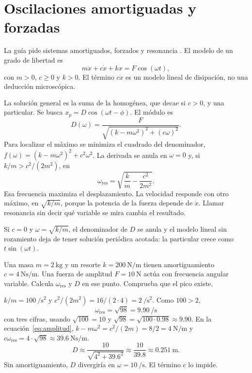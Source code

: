 \section{Oscilaciones amortiguadas y forzadas}

La guía pide sistemas amortiguados, forzados y resonancia \parencite{uleGuia2026}. El modelo de un grado de libertad es
\begin{equation}
\label{eq:oscilador}
m\ddot x+c\dot x+kx=F\cos(\omega t),
\end{equation}
con \(m>0\), \(c\ge 0\) y \(k>0\). El término \(c\dot x\) es un modelo lineal de disipación, no una deducción microscópica.

La solución general es la suma de la homogénea, que decae si \(c>0\), y una particular. Se busca \(x_p=D\cos(\omega t-\phi)\). El módulo es
\begin{equation}
\label{eq:amplitud}
D(\omega)=\frac{F}{\sqrt{(k-m\omega^2)^2+(c\omega)^2}}.
\end{equation}
Para localizar el máximo se minimiza el cuadrado del denominador, \(f(\omega)=(k-m\omega^2)^2+c^2\omega^2\). La derivada se anula en \(\omega=0\) y, si \(k/m>c^2/(2m^2)\), en
\begin{equation}
\label{eq:resonancia}
\omega_{\mathrm{res}}=\sqrt{\frac{k}{m}-\frac{c^2}{2m^2}}.
\end{equation}
Esa frecuencia maximiza el desplazamiento. La velocidad responde con otro máximo, en \(\sqrt{k/m}\), porque la potencia de la fuerza depende de \(\dot x\). Llamar resonancia sin decir qué variable se mira cambia el resultado.

Si \(c=0\) y \(\omega=\sqrt{k/m}\), el denominador de \(D\) se anula y el modelo lineal sin rozamiento deja de tener solución periódica acotada: la particular crece como \(t\sin(\omega t)\).

\begin{problembox}[Intermedio]
Una masa \(m=\qty{2}{\kilogram}\) y un resorte \(k=\qty{200}{\newton\per\metre}\) tienen amortiguamiento \(c=\qty{4}{\newton\second\per\metre}\). Una fuerza de amplitud \(F=\qty{10}{\newton}\) actúa con frecuencia angular variable. Calcula \(\omega_{\mathrm{res}}\) y \(D\) en ese punto. Comprueba que el pico existe.
\end{problembox}
\begin{solutionbox}
\(k/m=\qty{100}{\per\second\squared}\) y \(c^2/(2m^2)=16/(2\cdot 4)=\qty{2}{\per\second\squared}\). Como \(100>2\),
\[
\omega_{\mathrm{res}}=\sqrt{98}=\qty{9.90}{\per\second}
\]
con tres cifras, usando \(\sqrt{100}=10\) y \(\sqrt{98}=\sqrt{100\cdot 0.98}\approx 9.90\).
En la ecuación~\eqref{eq:amplitud}, \(k-m\omega^2=c^2/(2m)=8/2=\qty{4}{\newton\per\metre}\) y \(c\omega_{\mathrm{res}}=4\cdot\sqrt{98}\approx\qty{39.6}{\newton\second\per\metre}\).
\[
D\approx\frac{10}{\sqrt{4^2+39.6^2}}\approx\frac{10}{39.8}\approx\qty{0.251}{\metre}.
\]
Sin amortiguamiento, \(D\) divergiría en \(\omega=\qty{10}{\per\second}\). El término \(c\) lo impide.
\end{solutionbox}

